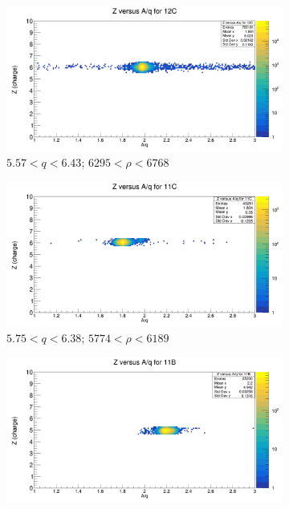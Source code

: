 \documentclass[12pt, letterpaper]{article}
\begin{document}
\begin{figure}[!htbp]
\begin{subfigure}{.5\textwidth}
  \centering
  \includegraphics[width=.9\linewidth]{z_vs_aq_12c.png}  
  \caption{$5.57 < q < 6.43$; $6295 < \rho < 6768$}
  \label{fig:sub-first}
\end{subfigure}
\begin{subfigure}{.5\textwidth}
  \centering
  \includegraphics[width=.9\linewidth]{z_vs_aq_11c.png} 
  \caption{$5.75 < q < 6.38$; $ 5774 < \rho < 6189$}
  \label{fig:sub-second}
\end{subfigure}
\begin{subfigure}{.5\textwidth}
  \centering
  \includegraphics[width=.9\linewidth]{z_vs_aq_11b.png} 

\end{subfigure}
\end{figure}
\end{document}
